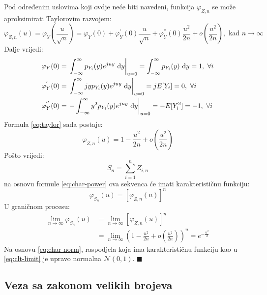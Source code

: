 Pod određenim uslovima koji ovdje neće biti navedeni, funkcija $\varphi_{Z,n}$
se može aproksimirati Taylorovim razvojem:
\begin{equation} \label{eq:taylor}
  \varphi_{Z,n}(u) = \varphi_Y\left(\frac{u}{\sqrt{n}}\right) 
  = \varphi_Y(0) + \varphi_Y^{'}(0)\frac{u}{\sqrt{n}}
  + \varphi_Y^{''}(0)\frac{u^2}{2n} + o\left(\frac{u^2}{2n}\right),
    \text{ kad } n\to\infty
\end{equation}
%
Dalje vrijedi:
\begin{align*}
  \varphi_Y(0)
    &= \left.\int_{-\infty}^{\infty} p_{Y_i}(y) e^{juy} \ \text dy\right|_{u=0}
    = \int_{-\infty}^{\infty} p_{Y_i}(y) \ \text dy = 1,\  \forall i \\
  \varphi_Y^{'}(0)
    &= \left.\int_{-\infty}^{\infty} jyp_{Y_i}(y)e^{juy} \ \text dy \right|_{u=0}
    = jE[Y_i] = 0,\ \forall i \\
  \varphi_Y^{''}(0)
    &= \left.-\int_{-\infty}^{\infty} y^2 p_{Y_i}(y)e^{juy} \ \text dy\right|_{u=0}
    = -E[Y_i^2] = -1,\ \forall i
\end{align*}
%
Formula \eqref{eq:taylor} sada postaje:
\begin{equation}
  \varphi_{Z,n}(u) = 1 - \frac{u^2}{2n} + o\left(\frac{u^2}{2n}\right)
\end{equation}
%
Pošto vrijedi:
\begin{equation}
  S_n = \sum_{i=1}^{n} Z_{i,n}
\end{equation}
na osnovu formule \eqref{eq:char-power} ova sekvenca će imati karakterističnu
funkciju:
\begin{equation}
  \varphi_{S_n}(u) = \left[\varphi_{Z,n}(u)\right]^n
\end{equation}
U graničnom procesu:
\begin{align} \label{eq:clt-limit}
  \lim_{n\to\infty} \varphi_{S_n}(u)
  &= \lim_{n\to\infty} [\varphi_{Z,n}(u)]^n \nonumber \\
  &= \lim_{n\to\infty}
    \left(1 - \frac{u^2}{2n} + o\left(\frac{u^2}{2n}\right)\right)^n
    = e^{-\frac{u^2}{2}}
\end{align}
Na osnovu \eqref{eq:char-norm}, raspodjela koja ima karakterističnu funkciju kao
u \eqref{eq:clt-limit} je upravo normalna $\mathcal{N}(0,1)$. $\blacksquare$ \\

\subsection{Veza sa zakonom velikih brojeva} \label{sec:clt-lln}

